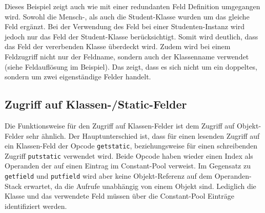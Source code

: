 \documentclass[conference]{IEEEtran}
\begin{document}
Dieses Beispiel zeigt auch wie mit einer redundanten Feld Definition umgegangen wird. Sowohl die Mensch-, als auch die Student-Klasse wurden um das gleiche Feld ergänzt. Bei der Verwendung des Feld bei einer Studenten-Instanz wird jedoch nur das Feld der Student-Klasse berücksichtigt. Somit wird deutlich, dass das Feld der vererbenden Klasse überdeckt wird. Zudem wird bei einem Feldzugriff nicht nur der Feldname, sondern auch der Klassenname verwendet (siehe Feldauflösung im Beispiel). Das zeigt, dass es sich nicht um ein doppeltes, sondern um zwei eigenständige Felder handelt. \cite{Venners.1996}


\subsection{Zugriff auf Klassen-/Static-Felder}
Die Funktionsweise für den Zugriff auf Klassen-Felder ist dem Zugriff auf Objekt-Felder sehr ähnlich. Der Hauptunterschied ist, dass für einen lesenden Zugriff auf ein Klassen-Feld der Opcode \verb|getstatic|, beziehungsweise für einen schreibenden Zugriff \verb|putstatic| verwendet wird. Beide Opcode haben wieder einen Index als Operanden der auf einen Eintrag im Constant-Pool verweist. Im Gegensatz zu \verb|getfield| und \verb|putfield| wird aber keine Objekt-Referenz auf dem Operanden-Stack erwartet, da die Aufrufe unabhängig von einem Objekt sind. Lediglich die Klasse und das verwendete Feld müssen über die Constant-Pool Einträge identifiziert werden.


 
\end{document}
